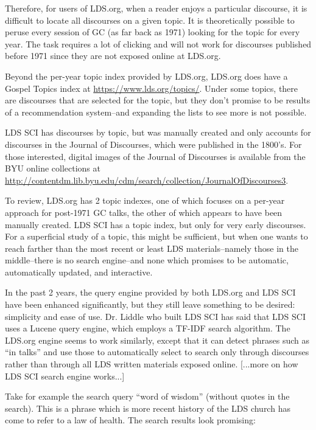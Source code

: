 Therefore, for users of LDS.org, when a reader enjoys a particular discourse, it is difficult to locate all discourses on a given topic. It is theoretically possible to peruse every session of GC (as far back as 1971) looking for the topic for every year. The task requires a lot of clicking and will not work for discourses published before 1971 since they are not exposed online at LDS.org.

Beyond the per-year topic index provided by LDS.org, LDS.org does have a Gospel Topics index at \url{https://www.lds.org/topics/}. Under some topics, there are discourses that are selected for the topic, but they don’t promise to be results of a recommendation system--and expanding the lists to see more is not possible.

LDS SCI has discourses by topic, but was manually created and only accounts for discourses in the Journal of Discourses, which were published in the 1800’s. For those interested, digital images of the Journal of Discourses is available from the BYU online collections at \url{http://contentdm.lib.byu.edu/cdm/search/collection/JournalOfDiscourses3}.

To review, LDS.org has 2 topic indexes, one of which focuses on a per-year approach for post-1971 GC talks, the other of which appears to have been manually created. LDS SCI has a topic index, but only for very early discourses. For a superficial study of a topic, this might be sufficient, but when one wants to reach farther than the most recent or least LDS materials--namely those in the middle--there is no search engine--and none which promises to be automatic, automatically updated, and interactive.

In the past 2 years, the query engine provided by both LDS.org and LDS SCI have been enhanced significantly, but they still leave something to be desired: simplicity and ease of use. Dr. Liddle who built LDS SCI has said that LDS SCI uses a Lucene query engine, which employs a TF-IDF search algorithm. The LDS.org engine seems to work similarly, except that it can detect phrases such as ``in talks'' and use those to automatically select to search only through discourses rather than through all LDS written materials exposed online. [...more on how LDS SCI search engine works...]

Take for example the search query ``word of wisdom'' (without quotes in the search). This is a phrase which is more recent history of the LDS church has come to refer to a law of health. The search results look promising:

